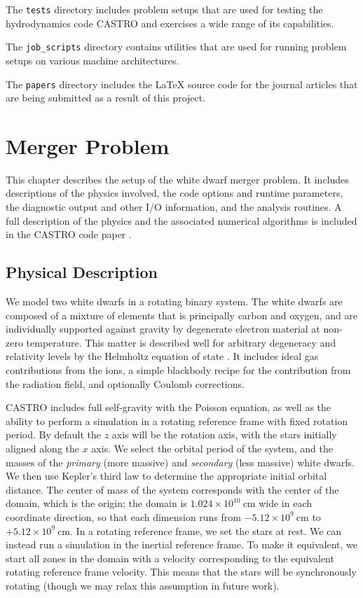 \documentclass[12pt]{book}
\begin{document}
The \texttt{tests} directory includes problem setups that are used for testing 
the hydrodynamics code CASTRO and exercises a wide range of its capabilities.

The \texttt{job\_scripts} directory contains utilities that are used for running
problem setups on various machine architectures.

The \texttt{papers} directory includes the LaTeX source code for the journal articles
that are being submitted as a result of this project.



\chapter{Merger Problem}

This chapter describes the setup of the white dwarf merger problem. It includes descriptions of 
the physics involved, the code options and runtime parameters, the diagnostic output 
and other I/O information, and the analysis routines. A full description of the physics 
and the associated numerical algorithms is included in the CASTRO code paper \cite{castro}.

\section{Physical Description}

We model two white dwarfs in a rotating binary system. The white dwarfs are composed of 
a mixture of elements that is principally carbon and oxygen, and are individually supported 
against gravity by degenerate electron material at non-zero temperature. This matter is described well 
for arbitrary degeneracy and relativity levels by the Helmholtz equation of state \cite{timmes_swesty:2000}.
It includes ideal gas contributions from the ions, a simple blackbody recipe for the contribution from 
the radiation field, and optionally Coulomb corrections. 

CASTRO includes full self-gravity with the Poisson equation, as well as the ability to perform a
simulation in a rotating reference frame with fixed rotation period. By default the $z$ axis will 
be the rotation axis, with the stars initially aligned along the $x$ axis. We select the 
orbital period of the system, and the masses of the \textit{primary} (more massive) and 
\textit{secondary} (less massive) white dwarfs. We then use Kepler's third law to determine the 
appropriate initial orbital distance. The center of mass of the system corresponds with the center 
of the domain, which is the origin; the domain is $1.024 \times 10^{10}\ \text{cm}$ wide in each 
coordinate direction, so that each dimension runs from $-5.12 \times 10^{9}\ \text{cm}$ to 
$+5.12 \times 10^{9}\ \text{cm}$. In a rotating reference frame, we set the stars at rest. 
We can instead run a simulation in the inertial reference frame. To make it equivalent, we
start all zones in the domain with a velocity corresponding to the equivalent rotating 
reference frame velocity. This means that the stars will be synchronously rotating (though we
may relax this assumption in future work).
\end{document}
